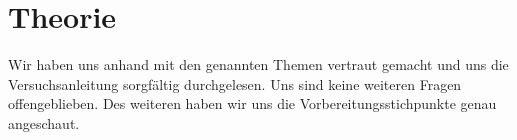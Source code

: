 \section{Theorie}
\label{sec:theorie}
Wir haben uns anhand \cite{Bleckwedel.Mathe2,Dorn.2008,Turtur.Sommersemester2017} mit den genannten Themen vertraut gemacht und uns die Versuchsanleitung sorgfältig durchgelesen. Uns sind keine weiteren Fragen offengeblieben.
Des weiteren haben wir uns die Vorbereitungsstichpunkte genau angeschaut.